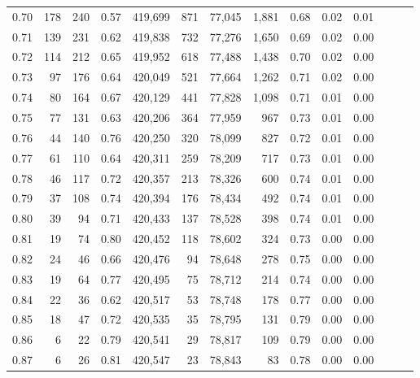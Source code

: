 \begin{tabular}{rrrrrrrrrrrrrr}
0.70 &     178 &    240 &  0.57 &  419,699 &      871 &  77,045 &   1,881 &  0.68 &  0.02 &      0.01 \\
0.71 &     139 &    231 &  0.62 &  419,838 &      732 &  77,276 &   1,650 &  0.69 &  0.02 &      0.00 \\
0.72 &     114 &    212 &  0.65 &  419,952 &      618 &  77,488 &   1,438 &  0.70 &  0.02 &      0.00 \\
0.73 &      97 &    176 &  0.64 &  420,049 &      521 &  77,664 &   1,262 &  0.71 &  0.02 &      0.00 \\
0.74 &      80 &    164 &  0.67 &  420,129 &      441 &  77,828 &   1,098 &  0.71 &  0.01 &      0.00 \\
0.75 &      77 &    131 &  0.63 &  420,206 &      364 &  77,959 &     967 &  0.73 &  0.01 &      0.00 \\
0.76 &      44 &    140 &  0.76 &  420,250 &      320 &  78,099 &     827 &  0.72 &  0.01 &      0.00 \\
0.77 &      61 &    110 &  0.64 &  420,311 &      259 &  78,209 &     717 &  0.73 &  0.01 &      0.00 \\
0.78 &      46 &    117 &  0.72 &  420,357 &      213 &  78,326 &     600 &  0.74 &  0.01 &      0.00 \\
0.79 &      37 &    108 &  0.74 &  420,394 &      176 &  78,434 &     492 &  0.74 &  0.01 &      0.00 \\
0.80 &      39 &     94 &  0.71 &  420,433 &      137 &  78,528 &     398 &  0.74 &  0.01 &      0.00 \\
0.81 &      19 &     74 &  0.80 &  420,452 &      118 &  78,602 &     324 &  0.73 &  0.00 &      0.00 \\
0.82 &      24 &     46 &  0.66 &  420,476 &       94 &  78,648 &     278 &  0.75 &  0.00 &      0.00 \\
0.83 &      19 &     64 &  0.77 &  420,495 &       75 &  78,712 &     214 &  0.74 &  0.00 &      0.00 \\
0.84 &      22 &     36 &  0.62 &  420,517 &       53 &  78,748 &     178 &  0.77 &  0.00 &      0.00 \\
0.85 &      18 &     47 &  0.72 &  420,535 &       35 &  78,795 &     131 &  0.79 &  0.00 &      0.00 \\
0.86 &       6 &     22 &  0.79 &  420,541 &       29 &  78,817 &     109 &  0.79 &  0.00 &      0.00 \\
0.87 &       6 &     26 &  0.81 &  420,547 &       23 &  78,843 &      83 &  0.78 &  0.00 &      0.00 \\

\end{tabular}

